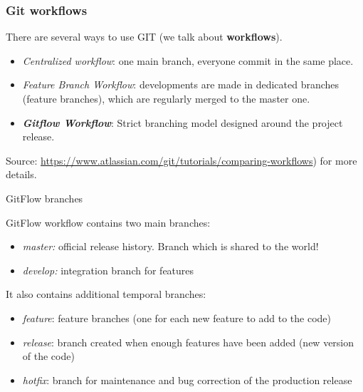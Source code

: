 \documentclass[svgnames]{beamer}
\begin{document}
\begin{frame}
    \frametitle{Git workflows} %
    There are several ways to use GIT (we talk about \textbf{workflows}). 

    \begin{itemize}
        \item \emph{Centralized workflow}: one main branch, everyone commit in the same place.
        \item \emph{Feature Branch Workflow}: developments are made in dedicated branches (feature branches), which are regularly merged to the master one.
        \item \textbf{\textit{Gitflow Workflow}}: Strict branching model designed around the project release.
    \end{itemize}

    Source: \url{https://www.atlassian.com/git/tutorials/comparing-workflows}) for more details.

\end{frame}

\begin{frame}{GitFlow branches}

    GitFlow workflow contains two main branches:
    \begin{itemize}
        \item{\emph{master:} official release history. Branch which is shared to the world!}
        \item{\emph{develop:} integration branch for features}
    \end{itemize}

    It also contains additional temporal branches:
    \begin{itemize}
        \item{\emph{feature}: feature branches (one for each new feature to add to the code)}
        \item{\emph{release}: branch created when enough features have been added (new version of the code)}
        \item{\emph{hotfix}: branch for maintenance and bug correction of the production release}
    \end{itemize}

\end{frame}
\end{document}
